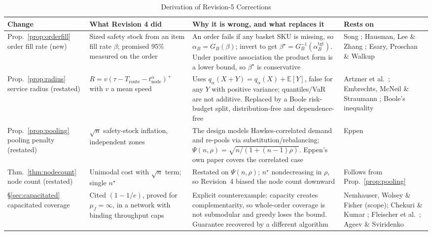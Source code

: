 \documentclass[10pt,twocolumn,letterpaper]{article}
\theoremstyle{definition}
\begin{document}
\begin{table}[t]
\caption{Derivation of Revision-5 Corrections}
\label{tab:derivation}
\centering\footnotesize
\begin{tabular}{@{}p{2.5cm}p{5.4cm}p{5.4cm}p{3.0cm}@{}}
\toprule
\textbf{Change} & \textbf{What Revision 4 did} & \textbf{Why it is wrong, and what replaces it} & \textbf{Rests on}\\
\midrule
Prop.~\ref{prop:orderfill} order fill rate (new) & Sized safety stock from an item fill rate $\beta$; promised 95\% measured on the order & An order fails if any basket SKU is missing, so $\alpha_B=G_B(\beta)$; invert to get $\beta^\star=G_B^{-1}(\alpha_B^{\mathrm{tgt}})$. Under positive association the product form is a lower bound, so $\beta^\star$ is conservative & Song \cite{song1998}; Hausman, Lee \& Zhang \cite{hausman1998}; Esary, Proschan \& Walkup \cite{esary1967}\\
Prop.~\ref{prop:radius} service radius (restated) & $R=v(\tau-T_{\mathrm{route}}-t^{\alpha}_{\mathrm{node}})^{+}$ with $v$ a mean speed & Uses $q_\alpha(X+Y)=q_\alpha(X)+\mathbb{E}[Y]$, false for any $Y$ with positive variance; quantiles/VaR are not additive. Replaced by a Boole risk-budget split, distribution-free and dependence-free & Artzner et al.\ \cite{artzner1999}; Embrechts, McNeil \& Straumann \cite{embrechts2002}; Boole's inequality \cite{feller1968}\\
Prop.~\ref{prop:pooling} pooling penalty (restated) & $\sqrt{n}$ safety-stock inflation, independent zones & The design models Hawkes-correlated demand and re-pools via substitution/rebalancing; $\Psi(n,\rho)=\sqrt{n/(1+(n-1)\rho)}$. Eppen's own paper covers the correlated case & Eppen \cite{eppen1979}\\
Thm.~\ref{thm:nodecount} node count (restated) & Unimodal cost with $\sqrt n$ term; single $n^\star$ & Restated on $\Psi(n,\rho)$; $n^\star$ nondecreasing in $\rho$, so Revision~4 biased the node count downward & Follows from Prop.~\ref{prop:pooling}\\
\S\ref{sec:capacitated} capacitated coverage & Cited $(1-1/e)$, proved for $\mu_f=\infty$, in a network with binding throughput caps & Explicit counterexample: capacity creates complementarity, so whole-order coverage is not submodular and greedy loses the bound. Guarantee recovered by a different algorithm & Nemhauser, Wolsey \& Fisher \cite{nemhauser1978} (scope); Chekuri \& Kumar \cite{chekuri2004}; Fleischer et al.\ \cite{fleischer2011}; Ageev \& Sviridenko \cite{ageev2004}\\

\end{tabular}
\end{table}
\end{document}
